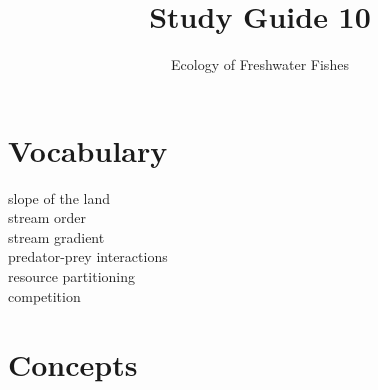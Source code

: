 \documentclass[letterpaper]{tufte-handout}
\title{Study Guide 10}
\author{Ecology of Freshwater Fishes}
\date{} %
\begin{document}
\maketitle	%


\section{Vocabulary} 
\vspace{-1\baselineskip}
\begin{multicols}{2}
slope of the land \\
stream order \\
stream gradient \\
predator-prey interactions \\
resource partitioning \\
competition
\end{multicols}

\section{Concepts}
\end{document}
